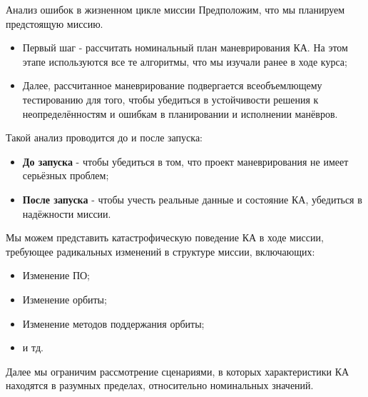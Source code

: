 \documentclass[8pt]{beamer}
\begin{document}
\begin{frame}{Анализ ошибок в жизненном цикле миссии}
Предположим, что мы планируем предстоящую миссию. 
\begin{itemize}
    \item Первый шаг - рассчитать номинальный план маневрирования КА. На этом этапе используются все те алгоритмы, что мы изучали ранее в ходе курса;
    \item Далее, рассчитанное маневрирование подвергается всеобъемлющему тестированию для того, чтобы убедиться в устойчивости решения к неопределённостям и ошибкам в планировании и исполнении манёвров.
\end{itemize}
Такой анализ проводится до и после запуска:
\begin{itemize}
    \item \textbf{До запуска} - чтобы убедиться в том, что проект маневрирования не имеет серьёзных проблем;
    \item \textbf{После запуска} - чтобы учесть реальные данные и состояние КА, убедиться в надёжности миссии.
\end{itemize}

Мы можем представить катастрофическую поведение КА в ходе миссии, требующее радикальных изменений в структуре миссии, включающих:
\begin{itemize}
    \item Изменение ПО;
    \item Изменение орбиты;
    \item Изменение методов поддержания орбиты;
    \item и тд.
\end{itemize}
Далее мы ограничим рассмотрение сценариями, в которых характеристики КА находятся в разумных пределах, относительно номинальных значений. 
\end{frame}
\end{document}
